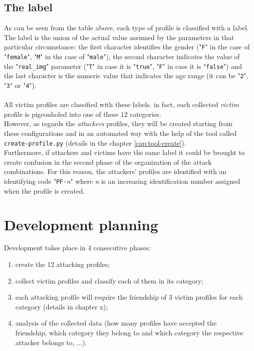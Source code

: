 \subsection*{The label}
As can be seen from the table above, each type of profile is classified with a label. \\The label is the union of the actual value assumed by the parameters in that particular circumstance: the first character identifies the gender ("\texttt{F}" in the case of "\texttt{female}", "\texttt{M}" in the case of "\texttt{male}"), the second character indicates the value of the "\texttt{real\_img}" parameter ("\texttt{T}" in case it is "\texttt{true}", "\texttt{F}" in case it is "\texttt{false}") and the last character is the numeric value that indicates the age range (it can be "\texttt{2}", "\texttt{3}" or "\texttt{4}").
\\\\All victim profiles are classified with these labels. in fact, each collected \textit{victim} profile is pigeonholed into one of these $12$ categories.\\However, as regards the \textit{attackers} profiles, they will be created starting from these configurations and in an automated way with the help of the tool called \texttt{create-profile.py} (details in the chapter \ref{cap:tool-create}). \\
Furthermore, if attackers and victims have the same label it could be brought to create confusion in the second phase of the organization of the attack combinations. For this reason, the attackers' profiles are identified with an identifying code "\texttt{PF-}\textit{n}" where \textit{n} is an increasing identification number assigned when the profile is created. 

\section{Development planning}
Development takes place in 4 consecutive phases:
\begin{enumerate}
	\item  create the 12 attacking profiles;
	\item  collect victim profiles and classify each of them in its category;
	\item  each attacking profile will require the friendship of 3 victim profiles for each category (details in chapter x);
	\item  analysis of the collected data (how many profiles have accepted the friendship, which category they belong to and which category the respective attacker belongs to, ...).		
\end{enumerate}

